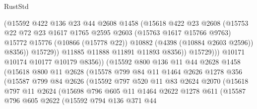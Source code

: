 \begin{lexlean}{RustStd}
\begin{coremodule}
                          (@15592
                            @422
                            @136
                            @23
                            @44
                            @2608
                            @1458
                            (@15618
                              @422
                              @23
                              @2608
                              (@15753
                                @22
                                @72
                                @23
                                @1617
                                @1765
                                @2595
                                @2603
                                (@15763 @1617 @15766 @9763)
                                @15772
                                @15776
                                (@10866 (@15778 @22))
                                @10882
                                (@4398 (@10884 @2603 @2596))
                                @8356))
                            @15729))
                        @11885
                        @11888
                        @11891
                        @11893
                        @8356))
                    @15729)))
              @10171
              @10174
              @10177
              @10179
              @8356))
          (@15592
            @800
            @136
            @11
            @44
            @2628
            @1458
            (@15618
              @800
              @11
              @2628
              (@15578
                @799
                @84
                @11
                @1464
                @2626
                @1278
                @356
                (@15587
                  @799
                  @84
                  @2626
                  (@15592
                    @797
                    @520
                    @11
                    @83
                    @2624
                    @2070
                    (@15618
                      @797
                      @11
                      @2624
                      (@15698
                        @796
                        @605
                        @11
                        @1464
                        @2622
                        @1278
                        @611
                        (@15587
                          @796
                          @605
                          @2622
                          (@15592
                            @794
                            @136
                            @371
                            @44

\end{coremodule}
\end{lexlean}
